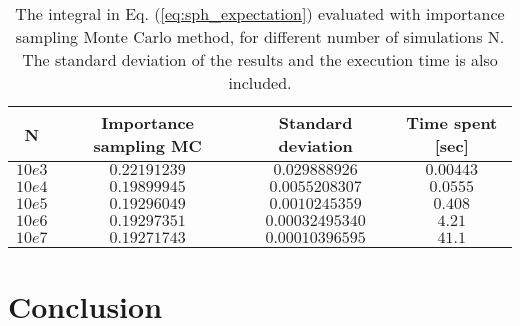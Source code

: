 \documentclass[12pt]{article}
\begin{document}
\begin{flushleft}
\begin{table}[!h]
\begin{center}
\begin{tabular}{| c | c | c | c |}
	\hline
	\textbf{N}  & \textbf{Importance sampling MC} &  \textbf{Standard deviation} & \textbf{Time spent [sec]}\\
	\hline		
	$10e3$ & $0.22191239$ & $0.029888926$ & $0.00443$ \\
    $10e4$ & $0.19899945$ & $0.0055208307$ & $0.0555$\\
    $10e5$ & $0.19296049$ & $0.0010245359$ & $0.408$\\
    $10e6$ & $0.19297351$ & $0.00032495340$ & $4.21$\\
    $10e7$ & $0.19271743$ & $0.00010396595$ & $41.1$\\
  \hline
\end{tabular}
\end{center}
\caption{\label{tab:isMC}The integral in Eq. (\ref{eq:sph_expectation}) evaluated with importance sampling Monte Carlo method, for different number of simulations N. The standard deviation of the results and the execution time is also included.}
\end{table}
\vspace{5mm}



\newpage
\section*{Conclusion}





\end{flushleft}
\end{document}

